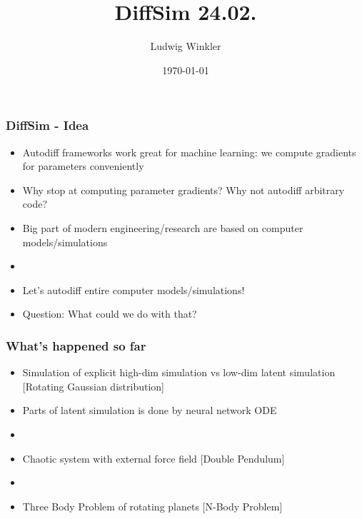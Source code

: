 \documentclass[usenames, dvipsnames, t]{beamer}
\title{DiffSim 24.02.}
\subtitle{}
\author{Ludwig Winkler}
\institute{Machine Learning Group \\ TU Berlin}
\date{\today}
\begin{document}
\def\mathn#1{\mathnormal{#1}}
\def\thet{\bm{\theta}}
\def\V{\mathn{V}}
\def\Q{\mathn{Q}}
\def\R{\mathn{R}}
\def\r{\mathn{r}}
\def\G{\mathn{G}}
\def\n{\mathn{n}}
\def\A{\mathn{A}}
\def\T{\mathn{T}}
\def\W{\mathn{W}}

\def\w{\mathn{w}}
\def\p{\mathn{p}}
\def\q{\mathn{q}}
\def\a{\mathn{a}}
\def\r{\mathn{r}}
\def\s{\mathn{s}}
\def\t{\mathn{t}}
\def\dist{1}

\newcommand{\E}{\mathbb{E}}



\begin{frame}
	\titlepage
\end{frame}


\begin{frame}
	\frametitle{DiffSim - Idea}
	\begin{itemize}
		\item Autodiff frameworks work great for machine learning: we compute gradients for parameters conveniently
		\item Why stop at computing parameter gradients? Why not autodiff arbitrary code?
		\item Big part of modern engineering/research are based on computer models/simulations
		\item[]
		\item Let's autodiff entire computer models/simulations!
		\item Question: What could we do with that?
	\end{itemize}
\end{frame}

\begin{frame}
	\frametitle{What's happened so far}
	\begin{itemize}
		\item Simulation of explicit high-dim simulation vs low-dim latent simulation [Rotating Gaussian distribution]
		\item Parts of latent simulation is done by neural network ODE
		\item[] 
		\item Chaotic system with external force field [Double Pendulum]
		\item[] 
		\item Three Body Problem of rotating planets [N-Body Problem]
	\end{itemize}
\end{frame}
\end{document}
